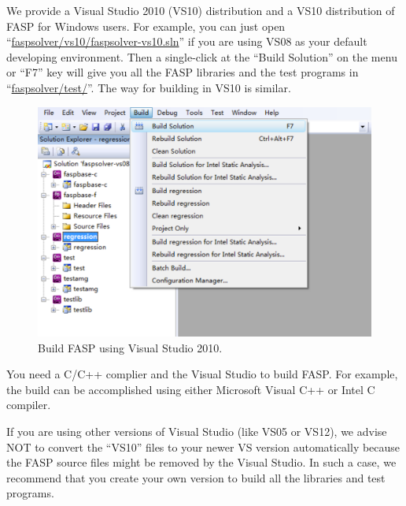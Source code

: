 \documentclass[11pt]{memoir}
\begin{document}
We provide a Visual Studio 2010 (VS10) distribution and a VS10
distribution of FASP for Windows users. For example, you can just open
``\url{faspsolver/vs10/faspsolver-vs10.sln}'' if you are using VS08 as
your default developing environment. Then a single-click at the
``Build Solution'' on the menu or ``F7'' key will give you all the
FASP libraries and the test programs in
``\url{faspsolver/test/}''. The way for building in VS10 is similar.
\begin{figure}[htbp] %
   \centering
   \includegraphics[width=\linewidth]{fig/build-fasp-win7.pdf} 
   \caption{Build FASP using Visual Studio 2010.}
   \label{fig:build}
\end{figure}

\begin{snugshade}\noindent
  You need a C/C++ complier and the Visual Studio to build FASP. For
  example, the build can be accomplished using either Microsoft Visual
  C++ or Intel C compiler. %
\end{snugshade}

\begin{snugshade}\noindent
  If you are using other versions of Visual Studio (like VS05 or
  VS12), we advise NOT to convert the ``VS10'' files to your newer VS version
  automatically because the FASP source files might be {\color{red}removed} by the
  Visual Studio. In such a case, we recommend that you
  create your own version to build all the libraries and test
  programs.
\end{snugshade}
\end{document}
